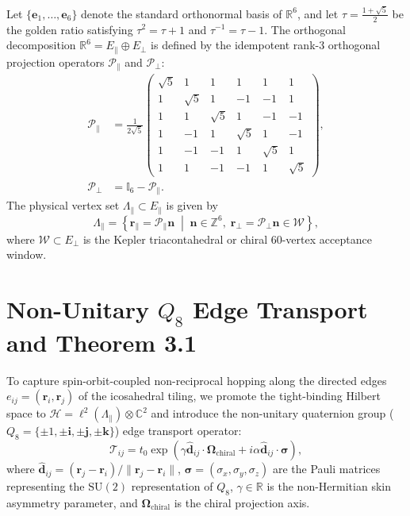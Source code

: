 \documentclass[aps,prx,twocolumn,superscriptaddress,longbibliography,nofootinbib]{revtex4-2}
\begin{document}
Let $\{\bm{e}_1, \dots, \bm{e}_6\}$ denote the standard orthonormal basis of $\mathbb{R}^6$, and let $\tau = \frac{1+\sqrt{5}}{2}$ be the golden ratio satisfying $\tau^2 = \tau + 1$ and $\tau^{-1} = \tau - 1$. The orthogonal decomposition $\mathbb{R}^6 = E_\parallel \oplus E_\perp$ is defined by the idempotent rank-3 orthogonal projection operators $\mathcal{P}_\parallel$ and $\mathcal{P}_\perp$:
\begin{align}
\mathcal{P}_\parallel &= \frac{1}{2\sqrt{5}} \begin{pmatrix}
\sqrt{5} & 1 & 1 & 1 & 1 & 1 \\
1 & \sqrt{5} & 1 & -1 & -1 & 1 \\
1 & 1 & \sqrt{5} & 1 & -1 & -1 \\
1 & -1 & 1 & \sqrt{5} & 1 & -1 \\
1 & -1 & -1 & 1 & \sqrt{5} & 1 \\
1 & 1 & -1 & -1 & 1 & \sqrt{5}
\end{pmatrix}, \\
\mathcal{P}_\perp &= \mathbb{I}_6 - \mathcal{P}_\parallel.
\end{align}
The physical vertex set $\Lambda_\parallel \subset E_\parallel$ is given by
\begin{equation}
\Lambda_\parallel = \left\{ \bm{r}_\parallel = \mathcal{P}_\parallel \bm{n} \;\middle|\; \bm{n} \in \mathbb{Z}^6,\; \bm{r}_\perp = \mathcal{P}_\perp \bm{n} \in \mathcal{W} \right\},
\end{equation}
where $\mathcal{W} \subset E_\perp$ is the Kepler triacontahedral or chiral 60-vertex acceptance window.

\section{Non-Unitary $Q_8$ Edge Transport and Theorem 3.1}
To capture spin-orbit-coupled non-reciprocal hopping along the directed edges $e_{ij} = (\bm{r}_i, \bm{r}_j)$ of the icosahedral tiling, we promote the tight-binding Hilbert space to $\mathcal{H} = \ell^2(\Lambda_\parallel) \otimes \mathbb{C}^2$ and introduce the non-unitary quaternion group ($Q_8 = \{\pm 1, \pm \mathbf{i}, \pm \mathbf{j}, \pm \mathbf{k}\}$) edge transport operator:
\begin{equation}
\mathcal{T}_{ij} = t_0 \exp\left( \gamma \hat{\bm{d}}_{ij} \cdot \bm{\Omega}_{\mathrm{chiral}} + i \alpha \hat{\bm{d}}_{ij} \cdot \bm{\sigma} \right),
\end{equation}
where $\hat{\bm{d}}_{ij} = (\bm{r}_j - \bm{r}_i)/\|\bm{r}_j - \bm{r}_i\|$, $\bm{\sigma} = (\sigma_x, \sigma_y, \sigma_z)$ are the Pauli matrices representing the $\mathrm{SU}(2)$ representation of $Q_8$, $\gamma \in \mathbb{R}$ is the non-Hermitian skin asymmetry parameter, and $\bm{\Omega}_{\mathrm{chiral}}$ is the chiral projection axis.
\end{document}
